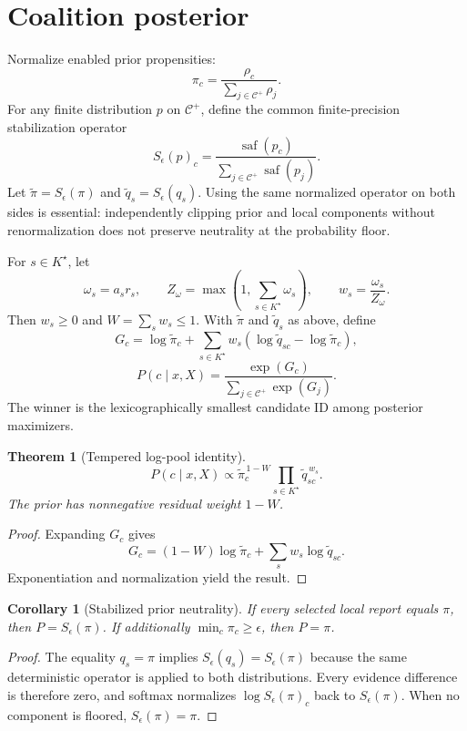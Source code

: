 \documentclass[11pt]{article}
\theoremstyle{definition}
\theoremstyle{plain}
\newtheorem{theorem}[definition]{Theorem}
\newtheorem{corollary}[definition]{Corollary}
\begin{document}
\section{Coalition posterior}

Normalize enabled prior propensities:
\[
\pi_c=\frac{\rho_c}{\sum_{j\in\mathcal C^+}\rho_j}.
\]
For any finite distribution $p$ on $\mathcal C^+$, define the common
finite-precision stabilization operator
\[
 S_\epsilon(p)_c=
 \frac{\operatorname{saf}(p_c)}
 {\sum_{j\in\mathcal C^+}\operatorname{saf}(p_j)}.
\]
Let $\widetilde\pi=S_\epsilon(\pi)$ and
$\widetilde q_s=S_\epsilon(q_s)$.  Using the same normalized operator on both
sides is essential: independently clipping prior and local components without
renormalization does not preserve neutrality at the probability floor.

For $s\in K^\star$, let
\[
\omega_s=a_sr_s,\qquad
Z_\omega=\max\left(1,\sum_{s\in K^\star}\omega_s\right),
\qquad
w_s=\frac{\omega_s}{Z_\omega}.
\]
Then $w_s\ge0$ and $W=\sum_s w_s\le1$.  With
$\widetilde\pi$ and $\widetilde q_s$ as above, define
\[
G_c=\log\widetilde\pi_c+
\sum_{s\in K^\star}
w_s(\log\widetilde q_{sc}-\log\widetilde\pi_c),
\]
\[
P(c\mid x,X)=
\frac{\exp(G_c)}{\sum_{j\in\mathcal C^+}\exp(G_j)}.
\]
The winner is the lexicographically smallest candidate ID among posterior
maximizers.

\begin{theorem}[Tempered log-pool identity]
\label{thm:logpool}
\[
P(c\mid x,X)\propto
\widetilde\pi_c^{\,1-W}
\prod_{s\in K^\star}\widetilde q_{sc}^{\,w_s}.
\]
The prior has nonnegative residual weight $1-W$.
\end{theorem}

\begin{proof}
Expanding $G_c$ gives
\[
G_c=(1-W)\log\widetilde\pi_c
+\sum_sw_s\log\widetilde q_{sc}.
\]
Exponentiation and normalization yield the result.
\end{proof}

\begin{corollary}[Stabilized prior neutrality]
\label{cor:prior-neutrality}
If every selected local report equals $\pi$, then
$P=S_\epsilon(\pi)$.  If additionally
$\min_c\pi_c\ge\epsilon$, then $P=\pi$.
\end{corollary}

\begin{proof}
The equality $q_s=\pi$ implies
$S_\epsilon(q_s)=S_\epsilon(\pi)$ because the same deterministic operator is
applied to both distributions.  Every evidence difference is therefore zero,
and softmax normalizes $\log S_\epsilon(\pi)_c$ back to
$S_\epsilon(\pi)$.  When no component is floored, $S_\epsilon(\pi)=\pi$.
\end{proof}
\end{document}
